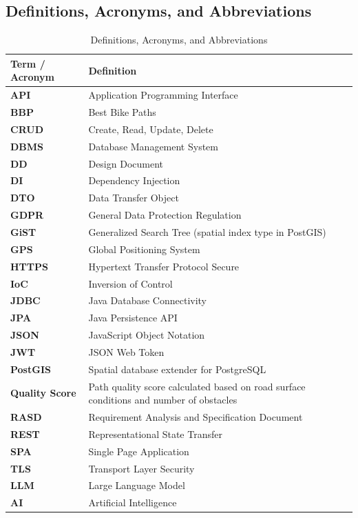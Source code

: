 \subsection{Definitions, Acronyms, and Abbreviations}
\begin{table}[H]
\centering
\renewcommand{\arraystretch}{1.5}
\begin{tabular}{|p{3.5cm}|p{10cm}|}
\hline
\textbf{Term / Acronym} & \textbf{Definition} \\
\hline
\textbf{API} & Application Programming Interface \\
\hline
\textbf{BBP} & Best Bike Paths \\
\hline
\textbf{CRUD} & Create, Read, Update, Delete \\
\hline
\textbf{DBMS} & Database Management System \\
\hline
\textbf{DD} & Design Document \\
\hline
\textbf{DI} & Dependency Injection \\
\hline
\textbf{DTO} & Data Transfer Object \\
\hline
\textbf{GDPR} & General Data Protection Regulation \\
\hline
\textbf{GiST} & Generalized Search Tree (spatial index type in PostGIS) \\
\hline
\textbf{GPS} & Global Positioning System \\
\hline
\textbf{HTTPS} & Hypertext Transfer Protocol Secure \\
\hline
\textbf{IoC} & Inversion of Control \\
\hline
\textbf{JDBC} & Java Database Connectivity \\
\hline
\textbf{JPA} & Java Persistence API \\
\hline
\textbf{JSON} & JavaScript Object Notation \\
\hline
\textbf{JWT} & JSON Web Token \\
\hline
\textbf{PostGIS} & Spatial database extender for PostgreSQL \\
\hline
\textbf{Quality Score} & Path quality score calculated based on road surface conditions and number of obstacles \\
\hline
\textbf{RASD} & Requirement Analysis and Specification Document \\
\hline
\textbf{REST} & Representational State Transfer \\
\hline
\textbf{SPA} & Single Page Application \\
\hline
\textbf{TLS} & Transport Layer Security \\
\hline
\textbf{LLM} & Large Language Model \\
\hline
\textbf{AI} & Artificial Intelligence \\
\hline
\end{tabular}
\caption{Definitions, Acronyms, and Abbreviations}
\label{tab:definitions_dd}
\end{table}


